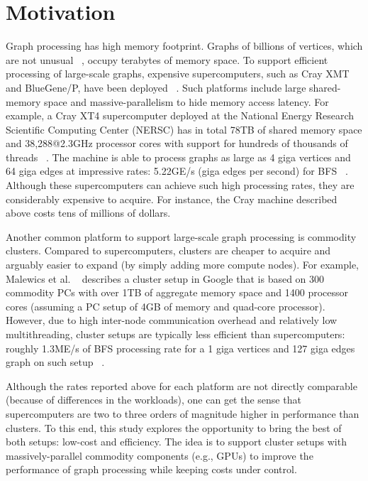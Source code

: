 \section{Motivation}
\label{sec:motivation}

Graph processing has high memory footprint. Graphs of billions of vertices, which are not unusual ~\cite{graph500}, occupy terabytes of memory space. To support efficient processing of large-scale graphs, expensive supercomputers, such as Cray XMT and BlueGene/P, have been deployed ~\cite{mizell2009early, yoo2005scalable}. Such platforms include large shared-memory space and massive-parallelism to hide memory access latency. For example, a Cray XT4 supercomputer deployed at the National Energy Research Scientific Computing Center (NERSC) has in total 78TB of shared memory space and 38,288@2.3GHz processor cores with support for hundreds of thousands of threads ~\cite{franklin2011cray}. The machine is able to process graphs as large as 4 giga vertices and 64 giga edges at impressive rates: 5.22GE/s (giga edges per second) for BFS ~\cite{graph500}. Although these supercomputers can achieve such high processing rates, they are considerably expensive to acquire. For instance, the Cray machine described above costs tens of millions of dollars.

Another common platform to support large-scale graph processing is commodity clusters. Compared to supercomputers, clusters are cheaper to acquire and arguably easier to expand (by simply adding more compute nodes). For example, Malewics et al. ~\cite{Malewicz2009} describes a cluster setup in Google that is based on 300 commodity PCs with over 1TB of aggregate memory space and 1400 processor cores (assuming a PC setup of 4GB of memory and quad-core processor). However, due to high inter-node communication overhead and relatively low multithreading, cluster setups are typically less efficient than supercomputers: roughly 1.3ME/s of BFS processing rate for a 1 giga vertices and 127 giga edges graph on such setup ~\cite{Malewicz2009}.

Although the rates reported above for each platform are not directly comparable (because of differences in the workloads), one can get the sense that supercomputers are two to three orders of magnitude higher in performance than clusters. To this end, this study explores the opportunity to bring the best of both setups: low-cost and efficiency. The idea is to support cluster setups with massively-parallel commodity components (e.g., GPUs) to improve the performance of graph processing while keeping costs under control. 

